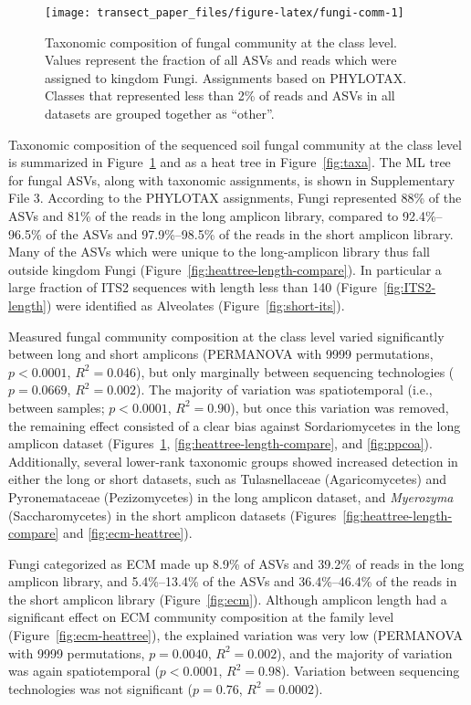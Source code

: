 \documentclass[
  12pt,
]{article}
\begin{document}
\begin{figure}

{\centering \texttt{[image: transect\_paper\_files/figure-latex/fungi-comm-1]} 

}

\caption[Taxonomic composition of fungal community at the class level]{Taxonomic composition of fungal community at the class level. Values represent the fraction of all ASVs and reads which were assigned to kingdom Fungi.
Assignments based on PHYLOTAX.
Classes that represented less than 2\% of reads and ASVs in all datasets are grouped together as ``other''.}\label{fig:fungi-comm}
\end{figure}

Taxonomic composition of the sequenced soil fungal community at the class level is summarized in Figure~\ref{fig:fungi-comm} and as a heat tree \autocite{foster2017} in Figure~\ref{fig:taxa}.
The ML tree for fungal ASVs, along with taxonomic assignments, is shown in Supplementary File 3.
According to the PHYLOTAX assignments, Fungi represented 88\% of the ASVs and 81\% of the reads in the long amplicon library, compared to 92.4\%--96.5\% of the ASVs and 97.9\%--98.5\% of the reads in the short amplicon library.
Many of the ASVs which were unique to the long-amplicon library thus fall outside kingdom Fungi (Figure~\ref{fig:heattree-length-compare}).
In particular a large fraction of ITS2 sequences with length less than 140 (Figure~\ref{fig:ITS2-length}) were identified as Alveolates (Figure~\ref{fig:short-its}).

Measured fungal community composition at the class level varied significantly between long and short amplicons (PERMANOVA with 9999 permutations, \(p<0.0001\), \(R^2=0.046\)), but only marginally between sequencing technologies (\(p=0.0669\), \(R^2=0.002\)).
The majority of variation was spatiotemporal (i.e., between samples; \(p<0.0001\), \(R^2=0.90\)), but once this variation was removed, the remaining effect consisted of a clear bias against Sordariomycetes in the long amplicon dataset (Figures~\ref{fig:fungi-comm}, \ref{fig:heattree-length-compare}, and \ref{fig:ppcoa}).
Additionally, several lower-rank taxonomic groups showed increased detection in either the long or short datasets, such as Tulasnellaceae (Agaricomycetes) and Pyronemataceae (Pezizomycetes) in the long amplicon dataset, and \emph{Myerozyma} (Saccharomycetes) in the short amplicon datasets (Figures~\ref{fig:heattree-length-compare} and \ref{fig:ecm-heattree}).

Fungi categorized as ECM made up 8.9\% of ASVs and 39.2\% of reads in the long amplicon library, and 5.4\%--13.4\% of the ASVs and 36.4\%--46.4\% of the reads in the short amplicon library (Figure~\ref{fig:ecm}).
Although amplicon length had a significant effect on ECM community composition at the family level (Figure~\ref{fig:ecm-heattree}), the explained variation was very low (PERMANOVA with 9999 permutations, \(p=0.0040\), \(R^2=0.002\)), and the majority of variation was again spatiotemporal (\(p<0.0001\), \(R^2=0.98\)).
Variation between sequencing technologies was not significant (\(p=0.76\), \(R^2=0.0002\)).
\end{document}
